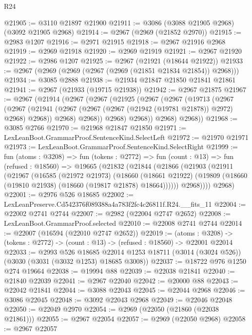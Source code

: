 \begin{lexlean}{R24}
\begin{coremodule}
@21905 := @3110 @21897 @21900
@21911 := @3086 (@3088 @21905 @2968) (@3092 @21905 @2968)
@21914 := @2967 (@2969 (@21852 @2970))
@21915 := @2983 @1207
@21916 := @2971 @21915
@21918 := @2967 @21916 @2968
@21919 := @2969 @21918
@21920 := @2969 @21919
@21921 := @2967 @21920
@21922 := @2986 @1207
@21925 := @2967 (@21921 (@18644 @21922))
@21933 := @2967 (@2969 (@2969 (@2967 (@2969 (@21851 @21834 @21854)) @2968)))
@21934 := @3085 @2888
@21938 := @21934 @21847 @21850 @21841 @21861
@21941 := @2967 (@21933 (@19715 @21938))
@21942 := @2967 @21875
@21967 := @2967
    (@21914
      (@2967
        (@2967
          (@21925
            (@2967
              (@2967
                (@19713
                  (@2967
                    (@2967
                      (@21941 (@2967 (@2967 (@2967 (@21942 (@19781 @21878)) @2972) @2968) @2968))
                      @2968)
                    @2968))
                @2968)
              @2968))
          @2968)
        @2968))
@21968 := @3085 @2766
@21970 := @21968 @21847 @21850
@21971 := LexLeanBoot.GrammarProof.SentenceKind.SelectLeft
@21972 := @21970 @21971
@21973 := LexLeanBoot.GrammarProof.SentenceKind.SelectRight
@21999 := fun (atoms : @3208) =>
  fun (tokens : @2772) =>
  fun (count : @13) =>
  fun (refused : @18560) =>
  @19665
    (@21832
      (@21844
        (@21866
          (@21903
            (@21911
              (@21967
                (@16585
                  (@21972 @21973)
                  (@18660
                    (@18661 @21922)
                    (@19809 (@18660 (@19810 @21938) (@18660 (@19817 @21878) @18664))))))
              @2968))))
      @2968)
@22001 := @2976 @526 @18685
@22002 := LexLeanPreserve.Cd542376f089388a4a783f2fc4c26811f.R24.__fits_11
@22004 := @22002 @2741 @2744
@22007 := @2982 (@22004 @2747 @2652)
@22008 := LexLeanBoot.GrammarProof.selected
@22010 := @22008 @2741 @2744
@22014 := @22007 (@16594 (@22010 @2747 @2652))
@22019 := (atoms : @3208) ->
  (tokens : @2772) -> (count : @13) -> (refused : @18560) -> @22001 @22014
@22033 := @2993
    @526
    @18685
    @22014
    @1253
    @18711
    (@3014 (@3024 @526))
    (@3030 (@3031 (@3032 @1253) @18685 @3008))
@22037 := @18722 @976 @1250 @274 @19664
@22038 := @19994 @88
@22039 := @22038 @21841
@22040 := @21840 @22039
@22041 := @2967 @22040
@22042 := @20000 @88
@22043 := @22042 @21841
@22044 := @3088 @22043
@22045 := @22044 @2968
@22046 := @3086 @22045
@22048 := @3092 @22043 @2968
@22049 := @22046 @22048
@22050 := @22049 @2970
@22054 := @2969 (@22050 (@21860 (@22038 @21861)))
@22055 := @2967 @22054
@22057 := @2969 (@22050 @2968)
@22058 := @2967 @22057

\end{coremodule}
\end{lexlean}
